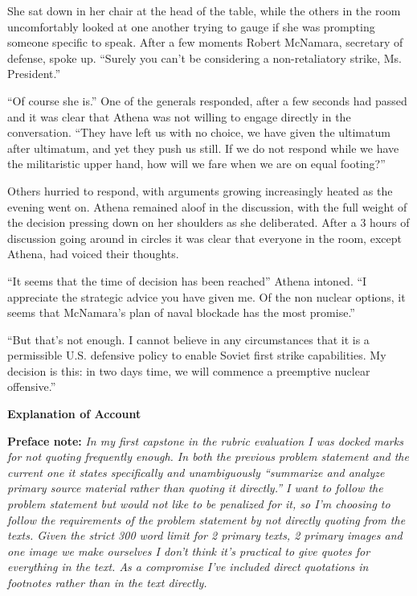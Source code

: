 \documentclass[letterpaper, reqno,11pt]{article}
\begin{document}
She sat down in her chair at the head of the table, while the others in the room uncomfortably looked at one another trying to gauge if she was prompting someone specific to speak. After a few moments Robert McNamara, secretary of defense, spoke up. ``Surely you can't be considering a non-retaliatory strike, Ms. President.''

``Of course she is.'' One of the generals responded, after a few seconds had passed and it was clear that Athena was not willing to engage directly in the conversation. ``They have left us with no choice, we have given the ultimatum after ultimatum, and yet they push us still. If we do not respond while we have the militaristic upper hand, how will we fare when we are on equal footing?''

Others hurried to respond, with arguments growing increasingly heated as the evening went on. Athena remained aloof in the discussion, with the full weight of the decision pressing down on her shoulders as she deliberated. After a 3 hours of discussion going around in circles it was clear that everyone in the room, except Athena, had voiced their thoughts. 

``It seems that the time of decision has been reached'' Athena intoned. ``I appreciate the strategic advice you have given me. Of the non nuclear options, it seems that McNamara's plan of naval blockade has the most promise.''

``But that's not enough. I cannot believe in any circumstances that it is a permissible U.S. defensive policy to enable Soviet first strike capabilities. My decision is this: in two days time, we will commence a preemptive nuclear offensive.''

{\bf Explanation of Account}

{\bf Preface note:} {\em In my first capstone in the rubric evaluation I was docked marks for not quoting frequently enough. In both the previous problem statement and the current one it states specifically and unambiguously ``summarize and analyze primary source material rather than quoting it directly.'' I want to follow the problem statement but would not like to be penalized for it, so I'm choosing to follow the requirements of the problem statement by not directly quoting from the texts. Given the strict 300 word limit for 2 primary texts, 2 primary images and one image we make ourselves I don't think it's practical to give quotes for everything in the text. As a compromise I've included direct quotations in footnotes rather than in the text directly. }
\end{document}

